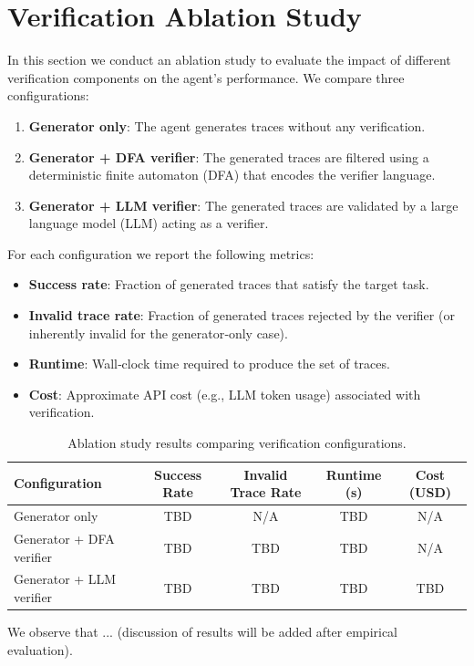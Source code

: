 \section{Verification Ablation Study}
\label{sec:verification_ablation_study}

In this section we conduct an ablation study to evaluate the impact of different verification components on the agent's performance. We compare three configurations:

\begin{enumerate}
  \item \textbf{Generator only}: The agent generates traces without any verification.
  \item \textbf{Generator + DFA verifier}: The generated traces are filtered using a deterministic finite automaton (DFA) that encodes the verifier language.
  \item \textbf{Generator + LLM verifier}: The generated traces are validated by a large language model (LLM) acting as a verifier.
\end{enumerate}

For each configuration we report the following metrics:

\begin{itemize}
  \item \textbf{Success rate}: Fraction of generated traces that satisfy the target task.
  \item \textbf{Invalid trace rate}: Fraction of generated traces rejected by the verifier (or inherently invalid for the generator‑only case).
  \item \textbf{Runtime}: Wall‑clock time required to produce the set of traces.
  \item \textbf{Cost}: Approximate API cost (e.g., LLM token usage) associated with verification.
\end{itemize}

\begin{table}[ht]
\centering
\caption{Ablation study results comparing verification configurations.}
\label{tab:ablation_results}
\begin{tabular}{lcccc}
\hline
Configuration & Success Rate & Invalid Trace Rate & Runtime (s) & Cost (USD) \\
\hline
Generator only & TBD & N/A & TBD & N/A \\
Generator + DFA verifier & TBD & TBD & TBD & N/A \\
Generator + LLM verifier & TBD & TBD & TBD & TBD \\
\hline
\end{tabular}
\end{table}

We observe that ... (discussion of results will be added after empirical evaluation).
